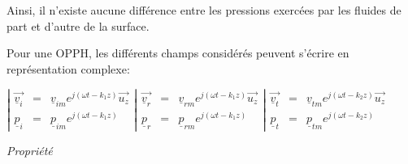 \documentclass[a4paper, 12pt]{article}
\begin{document}
Ainsi, il n'existe aucune différence entre les pressions exercées par les fluides de part et d'autre de la surface.

\newpage
\noindent{}

Pour une OPPH, les différents champs considérés peuvent s'écrire en représentation complexe:
\begin{center}
$\left|\begin{array}{ccc}
\overrightarrow{\underline{v}_{i}} & = & \underline{v}_{im}e^{j(\omega t-k_{1}z)}\overrightarrow{u_{z}}\\
\underline{p}_{i} & = & \underline{p}_{im}e^{j(\omega t-k_{1}z)}
\end{array}\right.\left|\begin{array}{ccc}
\overrightarrow{\underline{v}_{r}} & = & \underline{v}_{rm}e^{j(\omega t-k_{1}z)}\overrightarrow{u_{z}}\\
\underline{p}_{r} & = & \underline{p}_{rm}e^{j(\omega t-k_{1}z)}
\end{array}\right.\left|\begin{array}{ccc}
\overrightarrow{\underline{v}_{t}} & = & \underline{v}_{tm}e^{j(\omega t-k_{2}z)}\overrightarrow{u_{z}}\\
\underline{p}_{t} & = & \underline{p}_{tm}e^{j(\omega t-k_{2}z)}
\end{array}\right.$
\end{center}

\textit{Propriété}

\noindent{}
\end{document}
